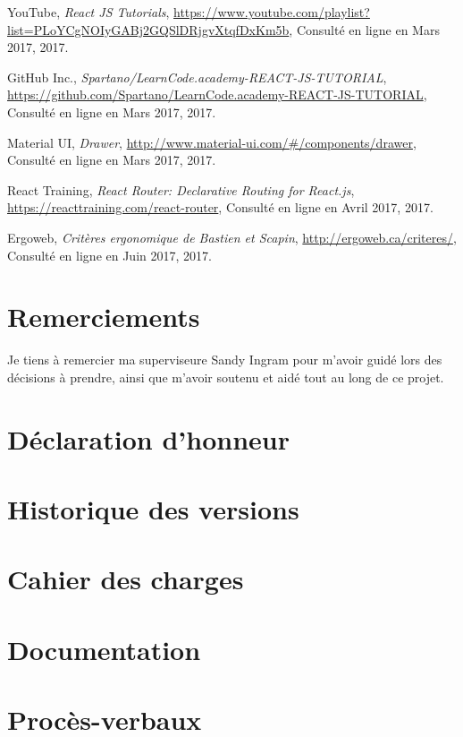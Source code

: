 \begin{thebibliography}{9}
  YouTube,
  \emph{React JS Tutorials},
  \url{https://www.youtube.com/playlist?list=PLoYCgNOIyGABj2GQSlDRjgvXtqfDxKm5b},
  Consulté en ligne en Mars 2017,
  2017.

  GitHub Inc.,
  \emph{Spartano/LearnCode.academy-REACT-JS-TUTORIAL},
  \url{https://github.com/Spartano/LearnCode.academy-REACT-JS-TUTORIAL},
  Consulté en ligne en Mars 2017,
  2017.

  Material UI,
  \emph{Drawer},
  \url{http://www.material-ui.com/#/components/drawer},
  Consulté en ligne en Mars 2017,
  2017.

  React Training,
  \emph{React Router: Declarative Routing for React.js},
  \url{https://reacttraining.com/react-router},
  Consulté en ligne en Avril 2017,
  2017.

  Ergoweb,
  \emph{Critères ergonomique de Bastien et Scapin},
  \url{http://ergoweb.ca/criteres/},
  Consulté en ligne en Juin 2017,
  2017.

\end{thebibliography}

\printglossary

\chapter*{Remerciements}
Je tiens à remercier ma superviseure Sandy Ingram pour m'avoir guidé lors des décisions à prendre, ainsi que m'avoir soutenu et aidé tout au long de ce projet.

\chapter*{Déclaration d'honneur}


\appendix

\chapter{Historique des versions}


\chapter{Cahier des charges}


\chapter{Documentation}


% 

\chapter{Procès-verbaux}




